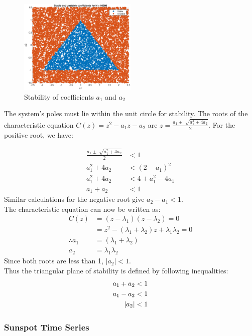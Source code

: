 \begin{figure}[h!]
\centering
\includegraphics[width=0.5\textwidth]{autoreg}
\caption{\label{fig:autoreg} Stability of coefficients $a_1$ and $a_2$}
\end{figure}

The system's poles must lie within the unit circle for stability. The roots of the characteristic equation $C(z)=z^2 -a_1 z - a_2$ are $z=\frac{a_1 \pm \sqrt[]{a_1^2 + 4a_2}}{2}$. For the positive root, we have:

\begin{align*}
\frac{a_1 \pm \sqrt[]{a_1^2 + 4a_2}}{2} &< 1\\
a_1^2 + 4a_2 &< (2-a_1)^2\\
a_1^2 + 4a_2 &< 4 + a_1^2 - 4a_1\\
a_1 + a_2 &< 1
\end{align*}
Similar calculations for the negative root give $a_2-a_1<1$.\\

The characteristic equation can now be written as:
\begin{align*}
C(z) &= (z-\lambda_1)(z-\lambda_2) = 0\\
&= z^2-(\lambda_1 + \lambda_2)z + \lambda_1\lambda_2=0\\
\therefore a_1 &= (\lambda_1 + \lambda_2)\\
a_2 &= \lambda_1\lambda_2
\end{align*}
Since both roots are less than 1, $|a_2|<1$.\\

Thus the triangular plane of stability is defined by following inequalities:
\begin{align}
\centering
a_1 + a_2 &< 1\\
a_1 - a_2 &< 1\\
|a_2|&<1
\end{align}

\pagebreak

\subsubsection{Sunspot Time Series}

